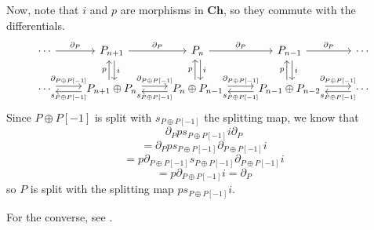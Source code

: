 Now, note that $i$ and $p$ are morphisms in $\mathbf{Ch}$, so they commute with the differentials.
\[\begin{tikzcd}
    \cdots \arrow[r, "\partial_P"]                             & P_{n+1} \arrow[r, "\partial_P"] \arrow[d, "i", shift left]                                                                                    & P_n \arrow[r, "\partial_P"] \arrow[d, "i", shift left]                                                                                        & P_{n-1} \arrow[r, "\partial_P"] \arrow[d, "i", shift left]                                                                                        & \cdots                                              \\
    \cdots \arrow[r, "{\partial_{P\oplus P[-1]}}", shift left] & P_{n+1}\oplus P_n \arrow[r, "{\partial_{P\oplus P[-1]}}", shift left] \arrow[u, "p", shift left] \arrow[l, "{s_{P\oplus P[-1]}}", shift left] & P_n\oplus P_{n-1} \arrow[r, "{\partial_{P\oplus P[-1]}}", shift left] \arrow[u, "p", shift left] \arrow[l, "{s_{P\oplus P[-1]}}", shift left] & P_{n-1}\oplus P_{n-2} \arrow[r, "{\partial_{P\oplus P[-1]}}", shift left] \arrow[u, "p", shift left] \arrow[l, "{s_{P\oplus P[-1]}}", shift left] & \cdots \arrow[l, "{s_{P\oplus P[-1]}}", shift left]
    \end{tikzcd}\]
Since $P\oplus P[-1]$ is split with $s_{P\oplus P[-1]}$ the splitting map, we know that
\[\partial_Pps_{P\oplus P[-1]}i\partial_P\]
\[=\partial_Pps_{P\oplus P[-1]}\partial_{P\oplus P[-1]}i\]
\[=p\partial_{P\oplus P[-1]}s_{P\oplus P[-1]}\partial_{P\oplus P[-1]}i\]
\[=p\partial_{P\oplus P[-1]}i=\partial_P\]
so $P$ is split with the splitting map $ps_{P\oplus P[-1]}i$.

For the converse, see \cite{Ralph_2012}.